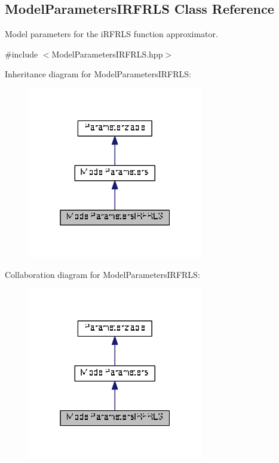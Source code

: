\hypertarget{classDmpBbo_1_1ModelParametersIRFRLS}{\subsection{Model\+Parameters\+I\+R\+F\+R\+L\+S Class Reference}
\label{classDmpBbo_1_1ModelParametersIRFRLS}
}


Model parameters for the i\+R\+F\+R\+L\+S function approximator.  




{\ttfamily \#include $<$Model\+Parameters\+I\+R\+F\+R\+L\+S.\+hpp$>$}



Inheritance diagram for Model\+Parameters\+I\+R\+F\+R\+L\+S\+:
\nopagebreak
\begin{figure}[H]
\begin{center}
\leavevmode
\includegraphics[width=217pt]{classDmpBbo_1_1ModelParametersIRFRLS__inherit__graph}
\end{center}
\end{figure}


Collaboration diagram for Model\+Parameters\+I\+R\+F\+R\+L\+S\+:
\nopagebreak
\begin{figure}[H]
\begin{center}
\leavevmode
\includegraphics[width=217pt]{classDmpBbo_1_1ModelParametersIRFRLS__coll__graph}
\end{center}
\end{figure}
